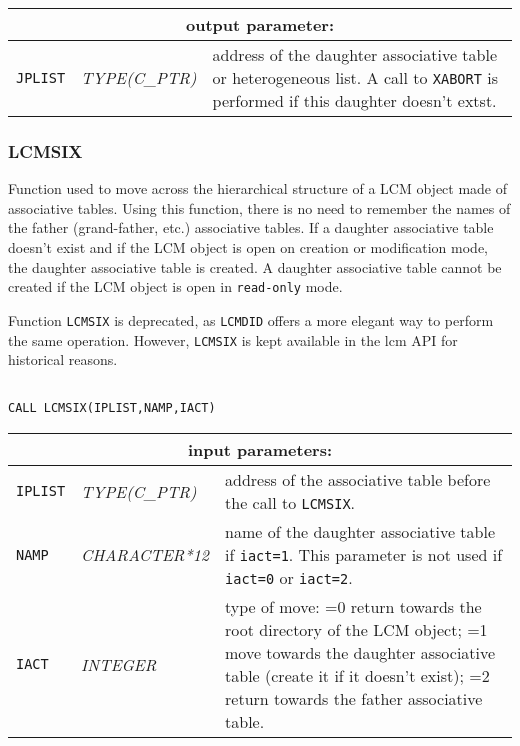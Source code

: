 \vskip 0.8cm

\noindent
\begin{tabular}{|p{1.5cm}|p{3cm}|p{10cm}|}
\hline
\multicolumn{3}{|c|}{\bf output parameter:} \\
\hline
{\tt JPLIST} & {\it TYPE(C\_PTR)} & address of the daughter associative table or heterogeneous list. A call to {\tt XABORT} is performed if this daughter doesn't extst. \\
\hline
\end{tabular}

\subsubsection{LCMSIX}

Function used to move across the hierarchical structure of a LCM object made of
associative tables. Using this function, there is no need to remember the names of
the father (grand-father, etc.) associative tables. If a daughter associative table doesn't
exist and if the LCM object is open on creation or modification mode, the daughter
associative table is created. A daughter associative table cannot be created if the
LCM object is open in {\tt read-only} mode.

\vskip 0.4cm

Function {\tt LCMSIX} is deprecated, as {\tt LCMDID} offers a more elegant way to perform the same operation.
However, {\tt LCMSIX} is kept available in the {\sc lcm} API for historical reasons.

\begin{verbatim}

CALL LCMSIX(IPLIST,NAMP,IACT)
\end{verbatim}

\noindent
\begin{tabular}{|p{1.5cm}|p{3cm}|p{10cm}|}
\hline
\multicolumn{3}{|c|}{\bf input parameters:} \\
\hline
{\tt IPLIST} & {\it TYPE(C\_PTR)} & address of the associative table before the call to {\tt LCMSIX}. \\
\hline
{\tt NAMP} & {\it CHARACTER*12} &  name of the daughter associative table if {\tt iact=1}. 
                                   This parameter is not used if {\tt iact=0} or {\tt iact=2}. \\
\hline
{\tt IACT} & {\it INTEGER} & type of move: =0 return towards the root directory of the LCM object; 
                                   =1 move towards the daughter associative table (create it if it doesn't exist); 
				   =2 return towards the father associative table. \\
\hline
\end{tabular}

